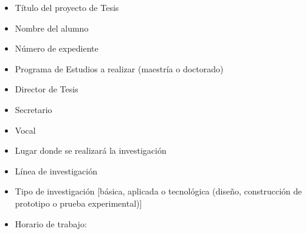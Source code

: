 \begin{itemize}
	\item Título del proyecto de Tesis
	\item Nombre del alumno
	\item Número de expediente
	\item Programa de Estudios a realizar (maestría o doctorado)
	\item Director de Tesis
	\item Secretario
	\item Vocal
	\item Lugar donde se realizará la investigación
	\item Línea de investigación
	\item Tipo de investigación [básica, aplicada o tecnológica (diseño, construcción de prototipo o prueba experimental)]
	\item Horario de trabajo:
\end{itemize}